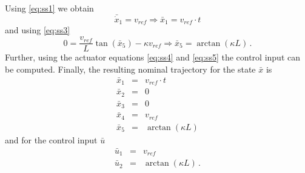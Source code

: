 \noindent Using \eqref{eq:ss1} we obtain
\begin{equation}
	\bar{\dot{x}}_1 = v_{ref} \Rightarrow \bar{x}_1 = v_{ref} \cdot t
\end{equation}
and using \eqref{eq:ss3}
\begin{equation}
	0 = \frac{v_{ref}}{L} \tan(\bar{x}_5) - \kappa v_{ref} \Rightarrow \bar{x}_5 = \arctan (\kappa L) \, .
\end{equation}
Further, using the actuator equations \eqref{eq:ss4} and \eqref{eq:ss5} the control input can be computed.
Finally, the resulting nominal trajectory for the state $\bar{x}$ is
\begin{eqnarray}
	\bar{x}_1 &=& v_{ref} \cdot t\\
	\bar{x}_2 &=& 0\\
	\bar{x}_3 &=& 0\\
	\bar{x}_4 &=& v_{ref}\\
	\bar{x}_5 &=& \arctan (\kappa L)
\end{eqnarray}
and for the control input $\bar{u}$
\begin{eqnarray}
	\bar{u}_1 &=& v_{ref}\\
	\bar{u}_2 &=& \arctan (\kappa L)\, .
\end{eqnarray}

